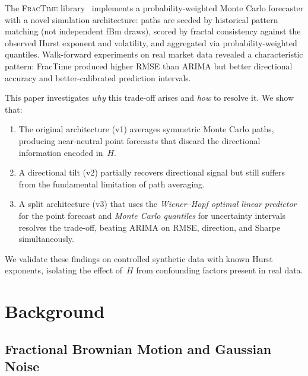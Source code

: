 \documentclass[12pt,a4paper]{article}
\begin{document}
The \textsc{FracTime} library~\citep{Galbo2026} implements a
probability-weighted Monte Carlo forecaster with a novel simulation
architecture: paths are seeded by historical pattern matching (not
independent fBm draws), scored by fractal consistency against the
observed Hurst exponent and volatility, and aggregated via
probability-weighted quantiles.  Walk-forward experiments on real market
data revealed a characteristic pattern: FracTime produced higher RMSE than
ARIMA but better directional accuracy and better-calibrated prediction
intervals.

This paper investigates \emph{why} this trade-off arises and \emph{how} to
resolve it.  We show that:
\begin{enumerate}
  \item The original architecture (v1) averages symmetric Monte Carlo paths,
        producing near-neutral point forecasts that discard the directional
        information encoded in~$H$.
  \item A directional tilt (v2) partially recovers directional signal but
        still suffers from the fundamental limitation of path averaging.
  \item A split architecture (v3) that uses the \emph{Wiener--Hopf optimal
        linear predictor} for the point forecast and \emph{Monte Carlo
        quantiles} for uncertainty intervals resolves the trade-off,
        beating ARIMA on RMSE, direction, and Sharpe simultaneously.
\end{enumerate}

We validate these findings on controlled synthetic data with known Hurst
exponents, isolating the effect of~$H$ from confounding factors present in
real data.

\section{Background}
\label{sec:background}

\subsection{Fractional Brownian Motion and Gaussian Noise}
\end{document}
